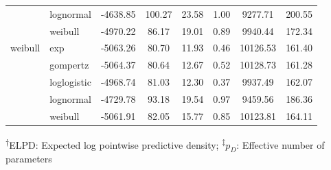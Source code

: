 \documentclass[AMA,STIX1COL]{WileyNJD-v2}
\begin{document}
\begin{table}[H]
\begin{tabular}{l l c c c c c c}
 & lognormal & -4638.85 & 100.27 & 23.58 & 1.00 & 9277.71 & 200.55\\
 & weibull & -4970.22 & 86.17 & 19.01 & 0.89 & 9940.44 & 172.34\\
weibull & exp & -5063.26 & 80.70 & 11.93 & 0.46 & 10126.53 & 161.40\\
 & gompertz & -5064.37 & 80.64 & 12.67 & 0.52 & 10128.73 & 161.28\\
 & loglogistic & -4968.74 & 81.03 & 12.30 & 0.37 & 9937.49 & 162.07\\
 & lognormal & -4729.78 & 93.18 & 19.54 & 0.97 & 9459.56 & 186.36\\
 & weibull & -5061.91 & 82.05 & 15.77 & 0.85 & 10123.81 & 164.11\\
\bottomrule
\end{tabular}
\begin{tablenotes}%
\textsuperscript{$\dagger$}ELPD: Expected log pointwise predictive density;
\textsuperscript{$\ddagger$}$p_D$: Effective number of parameters
\end{tablenotes}
\end{table}
\end{document}
